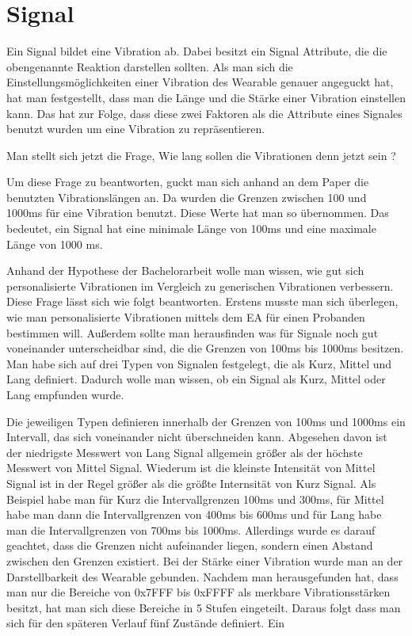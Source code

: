 

\section{Signal}
Ein Signal bildet eine Vibration ab. Dabei besitzt ein Signal Attribute, die die obengenannte Reaktion darstellen sollten. Als man sich die Einstellungsm{\"o}glichkeiten einer Vibration des Wearable genauer angeguckt hat, hat man festgestellt, dass man die L{\"a}nge und die St{\"a}rke einer Vibration einstellen kann. Das hat zur Folge, dass diese zwei Faktoren als die Attribute eines Signales benutzt wurden um eine Vibration zu repr{\"a}sentieren.

Man stellt sich jetzt die Frage,
Wie lang sollen die Vibrationen denn jetzt sein ? 

Um diese Frage zu beantworten, guckt man sich anhand an dem Paper \cite{pescara2016ruttelflug} die benutzten Vibrationsl{\"a}ngen an. Da wurden die Grenzen zwischen 100 und 1000ms f{\"u}r eine Vibration benutzt. Diese Werte hat man so {\"u}bernommen. Das bedeutet, ein Signal hat eine minimale L{\"a}nge von 100ms und eine maximale L{\"a}nge von 1000 ms. 

Anhand der Hypothese der Bachelorarbeit wolle man wissen, wie gut sich personalisierte Vibrationen im Vergleich zu generischen Vibrationen verbessern. Diese Frage l{\"a}sst sich wie folgt beantworten. Erstens musste man sich {\"u}berlegen, wie man personalisierte Vibrationen mittels dem EA f{\"u}r einen Probanden bestimmen will.
Au{\ss}erdem sollte man herausfinden was f{\"u}r Signale noch gut voneinander unterscheidbar sind, die die Grenzen von 100ms bis 1000ms besitzen.
Man habe sich auf drei Typen von Signalen festgelegt, die als Kurz, Mittel und Lang definiert. Dadurch wolle man wissen, ob ein Signal als Kurz, Mittel oder Lang empfunden wurde.

Die jeweiligen Typen definieren innerhalb der Grenzen von 100ms und 1000ms ein Intervall, das sich voneinander nicht {\"u}berschneiden kann. Abgesehen davon ist der niedrigste Messwert von Lang Signal allgemein gr{\"o}{\ss}er als der h{\"o}chste Messwert von Mittel Signal. Wiederum ist die kleinste Intensit{\"a}t von Mittel Signal ist in der Regel gr{\"o}{\ss}er als die gr{\"o}{\ss}te Internsit{\"a}t von Kurz Signal. Als Beispiel habe man f{\"u}r Kurz die Intervallgrenzen 100ms und 300ms, f{\"u}r Mittel habe man dann die Intervallgrenzen von 400ms bis 600ms und f{\"u}r Lang habe man die Intervallgrenzen von 700ms bis 1000ms. 
Allerdings wurde es darauf geachtet, dass die Grenzen nicht aufeinander liegen, sondern einen Abstand zwischen den Grenzen existiert. Bei der St{\"a}rke einer Vibration wurde man an der Darstellbarkeit des Wearable gebunden. Nachdem man herausgefunden hat, dass man nur die Bereiche von 0x7FFF bis 0xFFFF als merkbare Vibrationsst{\"a}rken besitzt, hat man sich diese Bereiche in 5 Stufen eingeteilt. Daraus folgt dass man sich f{\"u}r den sp{\"a}teren Verlauf f{\"u}nf Zust{\"a}nde definiert. Ein 

